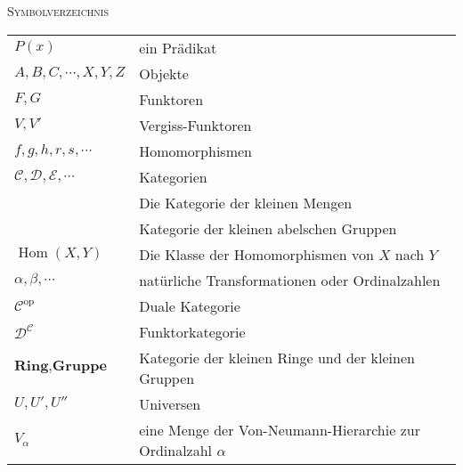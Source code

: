 \documentclass[a4paper]{amsart}
\theoremstyle{definition}
\DeclareMathOperator{\Hom}{Hom}
\newcommand{\CC}{\ensuremath{\mathcal{ C }}}
\newcommand{\DD}{\ensuremath{\mathcal{ D }}}
\newcommand{\Set}{\text{\textbf{Set}}}
\newcommand{\Ab}{\text{\textbf{Ab}}}
\begin{document}
\begin{large}
    \centerline{\textsc{Symbolverzeichnis}}
\end{large}
\bigskip

\renewcommand*{\arraystretch}{1}

\begin{tabular}{ll}
    $P(x)$                              & ein Prädikat\\
    $A, B, C, \cdots, X, Y, Z$          & Objekte\\
    $F,G$                               & Funktoren\\
    $V, V'$                             & Vergiss-Funktoren\\
    $f, g, h, r, s, \cdots$             & Homomorphismen\\
    $\mathcal C, \mathcal D, \mathcal E, \cdots$ & Kategorien\\
    \Set                                & Die Kategorie der kleinen Mengen\\
    \Ab                                 & Kategorie der kleinen abelschen Gruppen\\
    $\Hom( X, Y)$                       & Die Klasse der Homomorphismen von $X$ nach $Y$\\
    $\alpha, \beta, \cdots$             & natürliche Transformationen oder Ordinalzahlen\\
    $\mathcal C ^{\text{op}}$           & Duale Kategorie\\
    $\DD^\CC$                           & Funktorkategorie\\
    $\textbf{Ring}, \textbf{Gruppe}$    & Kategorie der kleinen Ringe und der kleinen Gruppen\\
    $U, U', U''$                        & Universen\\
    $V_\alpha$                          & eine Menge der Von-Neumann-Hierarchie zur Ordinalzahl
                                          $\alpha$

\end{tabular}
\end{document}

